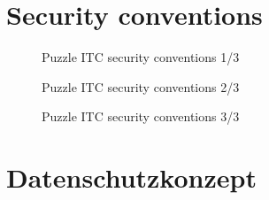 \section{Security conventions}
\label{sec:secconv}
\begin{figure}[h]
    \centering
    \caption{Puzzle ITC security conventions 1/3}
    \end{figure}
\begin{figure}[h]
    \centering
    \caption{Puzzle ITC security conventions 2/3 }
    \end{figure}  
\begin{figure}[h]
    \centering
    \caption{Puzzle ITC security conventions 3/3}
    \end{figure}  

\section{Datenschutzkonzept}
\label{sec:datsec}






